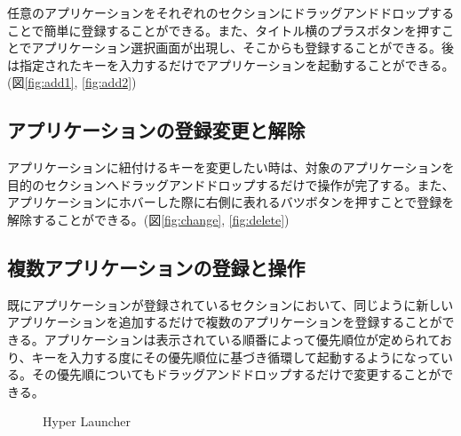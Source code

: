 任意のアプリケーションをそれぞれのセクションにドラッグアンドドロップすることで簡単に登録することができる。また、タイトル横のプラスボタンを押すことでアプリケーション選択画面が出現し、そこからも登録することができる。後は指定されたキーを入力するだけでアプリケーションを起動することができる。(図\ref{fig:add1}, \ref{fig:add2})

\subsection{アプリケーションの登録変更と解除}

アプリケーションに紐付けるキーを変更したい時は、対象のアプリケーションを目的のセクションへドラッグアンドドロップするだけで操作が完了する。また、アプリケーションにホバーした際に右側に表れるバツボタンを押すことで登録を解除することができる。(図\ref{fig:change}, \ref{fig:delete})

\subsection{複数アプリケーションの登録と操作}

既にアプリケーションが登録されているセクションにおいて、同じように新しいアプリケーションを追加するだけで複数のアプリケーションを登録することができる。アプリケーションは表示されている順番によって優先順位が定められており、キーを入力する度にその優先順位に基づき循環して起動するようになっている。その優先順についてもドラッグアンドドロップするだけで変更することができる。

\begin{figure}[h]
    \begin{center}
    \end{center}
    \caption{Hyper Launcher}
    \label{fig:hyper-launcher}
\end{figure}


